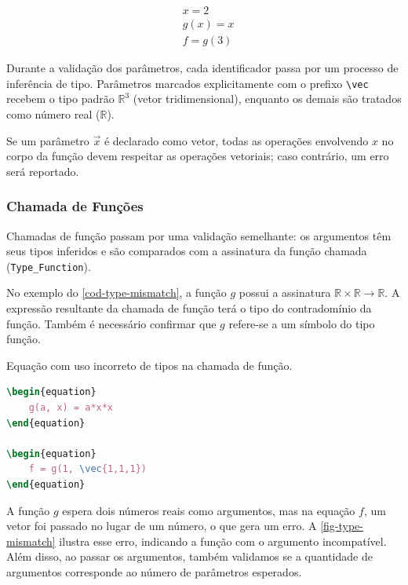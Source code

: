 \begin{align} \label{eq-shadowing}
    &x = 2 \\
    &g(x) = x \\
    &f = g(3)
\end{align}


Durante a validação dos parâmetros, cada identificador passa por um processo de inferência de tipo. Parâmetros marcados explicitamente com o prefixo \verb"\vec" recebem o tipo padrão $\mathbb{R}^3$ (vetor tridimensional), enquanto os demais são tratados como número real ($\mathbb{R}$).

Se um parâmetro $\vec{x}$ é declarado como vetor, todas as operações envolvendo $x$ no corpo da função devem respeitar as operações vetoriais; caso contrário, um erro será reportado.

\subsubsection{Chamada de Funções}
Chamadas de função passam por uma validação semelhante: os argumentos têm seus tipos inferidos e são comparados com a assinatura da função chamada (\verb"Type_Function").

No exemplo do \autoref{cod-type-mismatch}, a função $g$ possui a assinatura $\mathbb{R} \times \mathbb{R} \to \mathbb{R}$. A expressão resultante da chamada de função terá o tipo do contradomínio da função. Também é necessário confirmar que $g$ refere-se a um símbolo do tipo função.

\begin{codigo}[H]
    \caption{\small Equação com uso incorreto de tipos na chamada de função.}
    \label{cod-type-mismatch}
\begin{lstlisting}[language=tex, numbers=none, frame=none, inputencoding=latin1]
\begin{equation}
    g(a, x) = a*x*x
\end{equation}

\begin{equation}
    f = g(1, \vec{1,1,1})
\end{equation}

\end{lstlisting}
\end{codigo}

A função $g$ espera dois números reais como argumentos, mas na equação $f$, um vetor foi passado no lugar de um número, o que gera um erro. A \autoref{fig-type-mismatch} ilustra esse erro, indicando a função com o argumento incompatível. Além disso, ao passar os argumentos, também validamos se a quantidade de argumentos corresponde ao número de parâmetros esperados.

